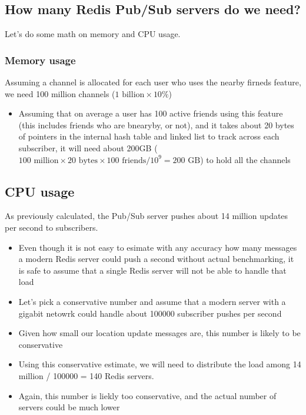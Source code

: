 \documentclass{report}
\theoremstyle{definition}
\let\oldsubsection\subsection
\let\oldsubsubsection\subsubsection
\renewcommand{\subsection}{\oldsubsection*}
\renewcommand{\subsubsection}{\oldsubsubsection*}
\begin{document}
\subsection{How many Redis Pub/Sub servers do we need?}

Let's do some math on memory and CPU usage.

\subsubsection{Memory usage}

Assuming a channel is allocated for each user who uses the nearby firneds feature, we need 100 million channels ($1 \text{ billion} \times 10\%$)

\begin{itemize}
\item
Assuming that on average a user has 100 active friends using this feature (this includes friends who are bnearyby, or not), and it takes about 20 bytes of pointers in the internal hash table and linked list to track across each subscriber, it will need about 200GB ($100 \text{ million} \times 20 \text{ bytes} \times 100 \text{ friends} / 10^{9} = 200 \text{ GB}$) to hold all the channels
\end{itemize}

\subsection{CPU usage}

As previously calculated, the Pub/Sub server pushes about 14 million updates per second to subscribers.

\begin{itemize}
\item
Even though it is not easy to esimate with any accuracy how many messages a modern Redis server could push a second without actual benchmarking, it is safe to assume that a single Redis server will not be able to handle that load
\item
Let's pick a conservative number and assume that a modern server with a gigabit netowrk could handle about 100000 subscriber pushes per second
\item
Given how small our location update messages are, this number is likely to be conservative
\item
Using this conservative estimate, we will need to distribute the load among 14 million / 100000 = 140 Redis servers.
\item
Again, this number is liekly too conservative, and the actual number of servers could be much lower
\end{itemize}
\end{document}
